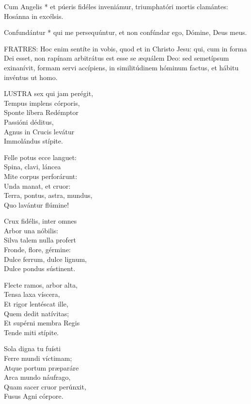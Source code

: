  Cum Angelis * et púeris fidéles inveniámur, triumphatóri mortis clamántes: Hosánna in excélsis.

 Confundántur * qui me persequúntur, et non confúndar ego, Dómine, Deus meus.


\lettrine[lines=2]{F}{RATRES}: Hoc enim sentíte in vobis, quod et in Christo Jesu: qui, cum in forma Dei esset, non rapínam arbitrátus est esse se æquálem Deo: sed semetípsum exinanívit, formam servi accípiens, in similitúdinem hóminum factus, et hábitu invéntus ut homo.


\lettrine[lines=2]{L}{USTRA} sex qui jam perégit,\\
Tempus implens córporis,\\
Sponte líbera Redémptor\\
Passióni déditus,\\
Agnus in Crucis levátur\\
Immolándus stípite.

Felle potus ecce languet:\\
Spina, clavi, láncea\\
Mite corpus perforárunt:\\
Unda manat, et cruor:\\
Terra, pontus, astra, mundus,\\
Quo lavántur flúmine!

Crux fidélis, inter omnes\\
Arbor una nóbilis:\\
Silva talem nulla profert\\
Fronde, flore, gérmine:\\
Dulce ferrum, dulce lignum,\\
Dulce pondus sústinent.

Flecte ramos, arbor alta,\\
Tensa laxa víscera,\\
Et rigor lentéscat ille,\\
Quem dedit natívitas;\\
Et supérni membra Regis\\
Tende miti stípite.

Sola digna tu fuísti\\
Ferre mundi víctimam;\\
Atque portum præparáre\\
Arca mundo náufrago,\\
Quam sacer cruor perúnxit,\\
Fusus Agni córpore.

